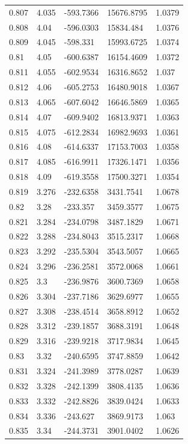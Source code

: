 \begin{tabular}{lllll}
0.807 & 4.035 & -593.7366 & 15676.8795 & 1.0379 \\
0.808 & 4.04 & -596.0303 & 15834.484 & 1.0376 \\
0.809 & 4.045 & -598.331 & 15993.6725 & 1.0374 \\
0.81 & 4.05 & -600.6387 & 16154.4609 & 1.0372 \\
0.811 & 4.055 & -602.9534 & 16316.8652 & 1.037 \\
0.812 & 4.06 & -605.2753 & 16480.9018 & 1.0367 \\
0.813 & 4.065 & -607.6042 & 16646.5869 & 1.0365 \\
0.814 & 4.07 & -609.9402 & 16813.9371 & 1.0363 \\
0.815 & 4.075 & -612.2834 & 16982.9693 & 1.0361 \\
0.816 & 4.08 & -614.6337 & 17153.7003 & 1.0358 \\
0.817 & 4.085 & -616.9911 & 17326.1471 & 1.0356 \\
0.818 & 4.09 & -619.3558 & 17500.3271 & 1.0354 \\
0.819 & 3.276 & -232.6358 & 3431.7541 & 1.0678 \\
0.82 & 3.28 & -233.357 & 3459.3577 & 1.0675 \\
0.821 & 3.284 & -234.0798 & 3487.1829 & 1.0671 \\
0.822 & 3.288 & -234.8043 & 3515.2317 & 1.0668 \\
0.823 & 3.292 & -235.5304 & 3543.5057 & 1.0665 \\
0.824 & 3.296 & -236.2581 & 3572.0068 & 1.0661 \\
0.825 & 3.3 & -236.9876 & 3600.7369 & 1.0658 \\
0.826 & 3.304 & -237.7186 & 3629.6977 & 1.0655 \\
0.827 & 3.308 & -238.4514 & 3658.8912 & 1.0652 \\
0.828 & 3.312 & -239.1857 & 3688.3191 & 1.0648 \\
0.829 & 3.316 & -239.9218 & 3717.9834 & 1.0645 \\
0.83 & 3.32 & -240.6595 & 3747.8859 & 1.0642 \\
0.831 & 3.324 & -241.3989 & 3778.0287 & 1.0639 \\
0.832 & 3.328 & -242.1399 & 3808.4135 & 1.0636 \\
0.833 & 3.332 & -242.8826 & 3839.0424 & 1.0633 \\
0.834 & 3.336 & -243.627 & 3869.9173 & 1.063 \\
0.835 & 3.34 & -244.3731 & 3901.0402 & 1.0626 \\

\end{tabular}
